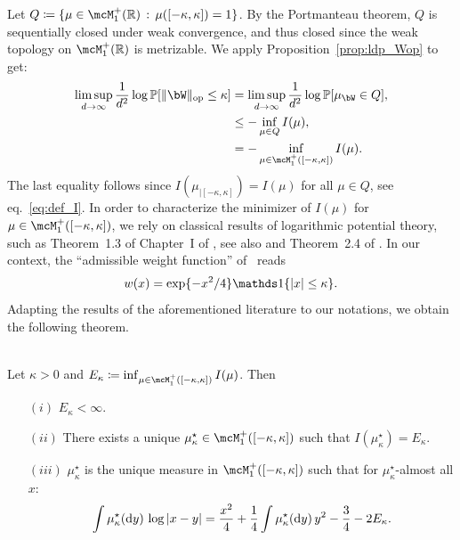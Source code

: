 \myskip
Let $Q \coloneqq \{\mu \in \mcM_1^+(\bbR) \, : \, \mu([-\kappa, \kappa]) = 1\}$. 
By the Portmanteau theorem, $Q$ is sequentially closed under weak convergence, and thus closed since the weak topology on $\mcM_1^+(\bbR)$ is metrizable.
We apply Proposition~\ref{prop:ldp_Wop} to get:
\begin{align}
    \label{eq:ub_ldp_Wop}
    \nonumber
     \limsup_{d \to \infty} \frac{1}{d^2} \log \bbP[\|\bW\|_\op \leq \kappa] &=  \limsup_{d \to \infty} \frac{1}{d^2} \log \bbP[\mu_\bW \in Q] , \\ 
    \nonumber
     &\leq - \inf_{\mu \in Q} I(\mu), \\ 
     &= - \inf_{\mu \in \mcM_1^+([-\kappa,\kappa])} I(\mu).
\end{align}
The last equality follows since $I(\mu_{|[-\kappa,\kappa]}) = I(\mu)$ for all $\mu \in Q$, see eq.~\eqref{eq:def_I}.
In order to characterize the minimizer of $I(\mu)$ for $\mu \in \mcM_1^+([-\kappa,\kappa])$, we
rely on classical results of logarithmic potential theory, such as Theorem~1.3 of Chapter~I of \cite{saff2013logarithmic}, see also \cite{mhaskar1985does} and Theorem~2.4 of \cite{arous1997large}.
In our context, the ``admissible weight function'' of~\cite{saff2013logarithmic} reads
\begin{equation*}
    w(x) = \exp\{-x^2/4\} \indi\{|x| \leq \kappa\}.
\end{equation*}
Adapting the results of the aforementioned literature to our notations, we obtain the following theorem.
\begin{theorem}
    \label{thm:properties_inf_I}
    ~\\
    Let $\kappa > 0$ and
    $E_\kappa \coloneqq \inf_{\mu \in \mcM_1^+([-\kappa,\kappa])} I(\mu)$. Then
    \begin{itemize}
        \item[$(i)$] $E_\kappa < \infty$.
        \item[$(ii)$] There exists a unique $\mu_\kappa^\star \in \mcM_1^+([-\kappa,\kappa])$ such that $I(\mu_\kappa^\star) = E_\kappa$.
        \item[$(iii)$] $\mu_\kappa^\star$ is the unique measure in $\mcM_1^+([-\kappa,\kappa])$ such that for $\mu_\kappa^\star$-almost all $x$: 
        \begin{equation*}
            \int \mu_\kappa^\star(\mathrm{d} y) \, \log |x - y| = \frac{x^2}{4} + \frac{1}{4} \int \mu_\kappa^\star(\mathrm{d} y) \, y^2 - \frac{3}{4} - 2 E_\kappa.
        \end{equation*}
    \end{itemize} 
\end{theorem}
